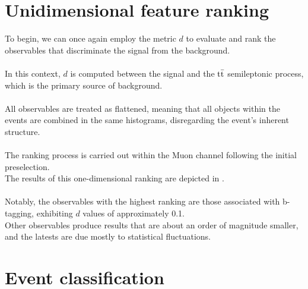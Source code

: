 \begin{minipage}[H]{\linewidth}
\begin{minipage}{0.62\linewidth}
\section{Unidimensional feature ranking}
To begin,  we can once again employ the metric $d$ to evaluate and rank the observables that discriminate the signal from the background.\\
\\
In this context, $d$ is computed between the signal and the ${{\text{t}}{\bar{\text{t}}}}$ semileptonic process, which is the primary source of background.\\
\\
All observables are treated as flattened, meaning that all objects within the events are combined in the same histograms, disregarding the event's inherent structure.\\
\\
The ranking process is carried out within the Muon channel following the initial preselection.\\
The results of this one-dimensional ranking are depicted in .\\
\\
Notably, the observables with the highest ranking are those associated with b-tagging, exhibiting $d$ values of approximately 0.1.\\
Other observables produce results that are about an order of magnitude smaller, and the latests are due mostly to statistical fluctuations.

\end{minipage}
        \label{fig:1Drank}  
\end{minipage}
\section{Event classification}
